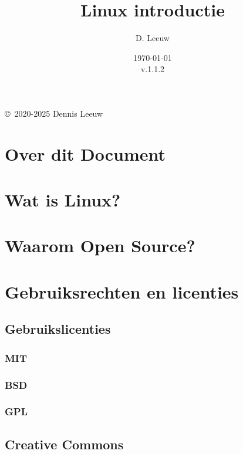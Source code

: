 \documentclass[a4paper,12pt,twoside,openright,titlepage]{book}
\author{D. Leeuw}
\title{Linux introductie}
\date{\today\\v.1.1.2}
\begin{document}

\maketitle

\copyright\ 2020-2025 Dennis Leeuw\\




\frontmatter
\chapter{Over dit Document}



\tableofcontents

\mainmatter

\chapter{Wat is Linux?}


\chapter{Waarom Open Source?}


\chapter{Gebruiksrechten en licenties}

\section{Gebruikslicenties}
\subsection{MIT}

\subsection{BSD}

\subsection{GPL}

\section{Creative Commons}

\end{document}
